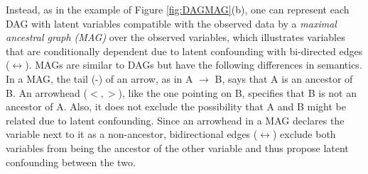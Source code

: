 \documentclass[conference]{IEEEtran}
\begin{document}
Instead, as in the example of Figure \ref{fig:DAGMAG}(b), one can represent each DAG with latent variables compatible with the observed data by a \textit{maximal ancestral graph (MAG)} over the observed variables, which illustrates variables that are conditionally dependent due to latent confounding with bi-directed edges ($\leftrightarrow$)\cite{richardson_ancestral_2002}. 
MAGs are similar to DAGs but have the following differences in semantics. In a MAG, the tail (-) of an arrow, as in A $\rightarrow$ B, says that A is an ancestor of B. An arrowhead ($<,>$), like the one pointing on B, specifies that B is not an ancestor of A. Also, it does not exclude the possibility that A and B might be related due to latent confounding.
Since an arrowhead in a MAG declares the variable next to it as a non-ancestor, bidirectional edges ($\leftrightarrow$) exclude both variables from being the ancestor of the other variable and thus propose latent confounding between the two.
\end{document}
